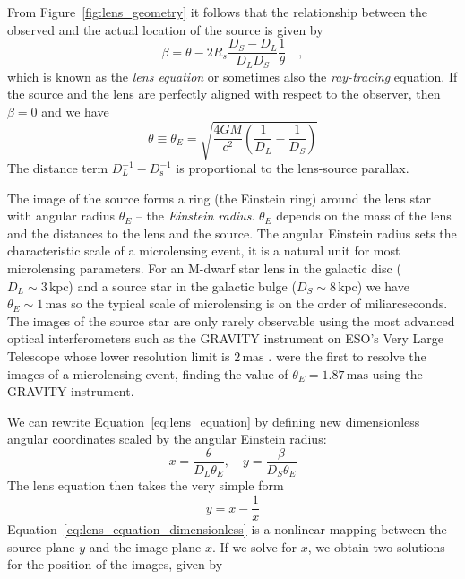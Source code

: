 \documentclass[11pt]{report}
\begin{document}
From Figure~\ref{fig:lens_geometry} it follows that the relationship between
the observed and the actual location of the source is given by
\begin{equation}
    \beta=\theta-2 R_s \frac{D_S-D_L}{D_LD_S}
    \frac{1}{\theta}\quad,
    \label{eq:lens_equation}
\end{equation}
which is known as the \emph{lens equation} or sometimes also the \emph{ray-tracing}
equation. If the source and the lens are perfectly aligned with respect to the observer,
then $\beta=0$ and we have
\begin{equation}
    \theta \equiv \theta_E= \sqrt{ \frac{4GM}{c^2} \left( \frac{1}{D_L} - \frac{1}{D_S} \right)}
\end{equation}
The distance term $D_L^{-1}-D_\textrm{s}^{-1}$ is proportional to the
lens-source parallax.

The image of the source forms a ring (the Einstein ring) around the lens star
with angular radius $\theta_E$ -- the \emph{Einstein radius}. $\theta_E$
depends on the mass of the lens and the distances to the lens and the source.
The angular Einstein radius sets the characteristic scale of a microlensing
event, it is a natural unit for most microlensing parameters. For an M-dwarf
star lens in the galactic disc ($D_L\sim 3\,\textrm{kpc}$) and a source star in
the galactic bulge ($D_S\sim 8\,\textrm{kpc}$) we have $\theta_E\sim
    1\,\textrm{mas}$ so the typical scale of microlensing is on the order of
miliarcseconds. The images of the source star are only rarely observable using
the most advanced optical interferometers such as the GRAVITY instrument on
ESO's Very Large Telescope whose lower resolution limit is $2\,\textrm{mas}$
\citep{arXiv:1705.02345}. \cite{2019ApJ...871...70D} were the first to resolve
the images of a microlensing event, finding the value of
$\theta_E=1.87\,\textrm{mas}$ using the GRAVITY instrument.

We can rewrite Equation~\ref{eq:lens_equation} by defining new dimensionless
angular coordinates scaled by the angular Einstein radius:
\begin{equation}
    x= \frac{\theta}{D_L\theta_E}, \quad y=\frac{\beta}{D_S\theta_E}
\end{equation}
The lens equation then takes the very simple form
\begin{equation}
    y= x- \frac{ 1}{x}
    \label{eq:lens_equation_dimensionless}
\end{equation}
Equation~\ref{eq:lens_equation_dimensionless} is a nonlinear mapping between the
source plane $y$ and the image plane $x$.
If we solve for $x$, we obtain two solutions for the position of the images, given by
\end{document}
